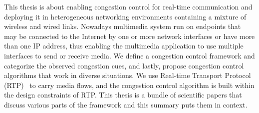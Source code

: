 This thesis is about enabling congestion control for real-time communication and
deploying it in heterogeneous networking environments containing a mixture of
wireless and wired links. Nowadays multimedia system run on endpoints that may
be connected to the Internet by one or more network interfaces or have more 
than one IP address, thus enabling the multimedia application to
use multiple interfaces to send or receive media. 
We define a congestion control framework and categorize the observed congestion
cues, and lastly, propose congestion control algorithms that work in diverse
situations. We use Real-time Transport Protocol (RTP)~\cite{rfc3550} to carry
media flows, and the congestion control algorithm is built within the
design constraints of RTP. This thesis is a bundle of scientific papers that 
discuss various parts of the framework and this summary puts them in context.





